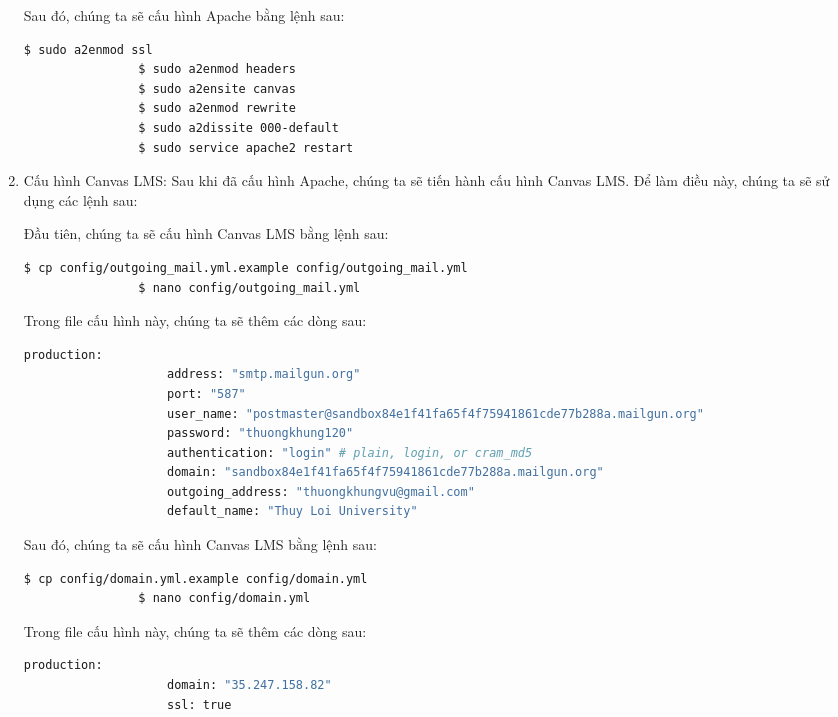 \documentclass[../Thesis.tex]{subfiles}
\begin{document}
\begin{enumerate}
            Sau đó, chúng ta sẽ cấu hình Apache bằng lệnh sau:
            \begin{lstlisting}[language=bash]
                $ sudo a2enmod ssl
                $ sudo a2enmod headers
                $ sudo a2ensite canvas
                $ sudo a2enmod rewrite
                $ sudo a2dissite 000-default
                $ sudo service apache2 restart
            \end{lstlisting}

            \item Cấu hình Canvas LMS: Sau khi đã cấu hình Apache, chúng ta sẽ tiến hành cấu hình Canvas LMS. Để làm điều này, chúng ta sẽ sử dụng các lệnh sau:
            
            Đầu tiên, chúng ta sẽ cấu hình Canvas LMS bằng lệnh sau:
            \begin{lstlisting}[language=bash]
                $ cp config/outgoing_mail.yml.example config/outgoing_mail.yml
                $ nano config/outgoing_mail.yml
            \end{lstlisting}

            Trong file cấu hình này, chúng ta sẽ thêm các dòng sau:
            \begin{lstlisting}[language=bash]
                production:
                    address: "smtp.mailgun.org"
                    port: "587"
                    user_name: "postmaster@sandbox84e1f41fa65f4f75941861cde77b288a.mailgun.org"
                    password: "thuongkhung120"
                    authentication: "login" # plain, login, or cram_md5
                    domain: "sandbox84e1f41fa65f4f75941861cde77b288a.mailgun.org"
                    outgoing_address: "thuongkhungvu@gmail.com"
                    default_name: "Thuy Loi University"
            \end{lstlisting}

            Sau đó, chúng ta sẽ cấu hình Canvas LMS bằng lệnh sau:
            \begin{lstlisting}[language=bash]
                $ cp config/domain.yml.example config/domain.yml
                $ nano config/domain.yml
            \end{lstlisting}

            Trong file cấu hình này, chúng ta sẽ thêm các dòng sau:
            \begin{lstlisting}[language=bash]
                production:
                    domain: "35.247.158.82"
                    ssl: true
            \end{lstlisting}


\end{enumerate}
\end{document}
